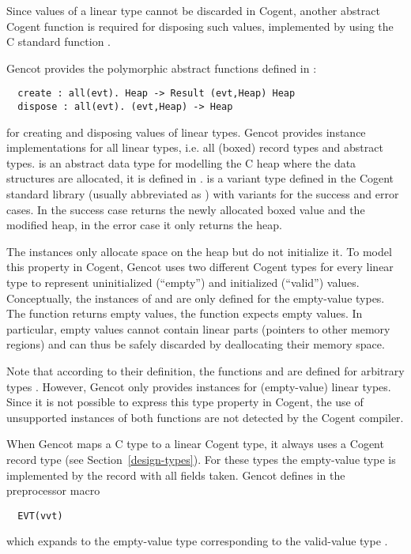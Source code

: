 Since values of a linear type cannot be discarded in Cogent, another abstract Cogent function is required for
disposing such values, implemented by using the C standard function .

Gencot provides the polymorphic abstract functions defined in :
\begin{verbatim}
  create : all(evt). Heap -> Result (evt,Heap) Heap
  dispose : all(evt). (evt,Heap) -> Heap
\end{verbatim}
for creating and disposing values of linear types. Gencot provides instance implementations for all linear
types, i.e. all (boxed) record types and abstract types.  is an abstract data type for modelling
the C heap where the data structures are allocated, it is defined in .
 is a variant type defined in the Cogent standard library (usually abbreviated as )
with variants for the success and error cases. In the success case  returns the newly allocated 
boxed value and the modified heap, in the error case it only returns the heap.

The  instances only allocate space on the heap but do not initialize it. To model this property in 
Cogent, Gencot uses two different Cogent types for every linear type to represent uninitialized (``empty'') and 
initialized (``valid'') values.
Conceptually, the instances of  and  are only defined for the empty-value types.
The function  returns empty values, the function  expects empty values. In particular,
empty values cannot contain linear parts (pointers to other memory regions) and can thus be safely discarded by 
deallocating their memory space. 

Note that according to their definition, the functions  and  are defined for arbitrary
types . However, Gencot only provides instances for (empty-value) linear types. Since it is not possible
to express this type property in Cogent, the use of unsupported instances of both functions are not detected by the 
Cogent compiler.

When Gencot maps a C type to a linear Cogent type, it always uses a Cogent record type (see Section~\ref{design-types}).
For these types the empty-value type is implemented by the record with all fields taken. Gencot defines in 
 the preprocessor macro
\begin{verbatim}
  EVT(vvt)
\end{verbatim}
which expands to the empty-value type  corresponding to the valid-value type . 


